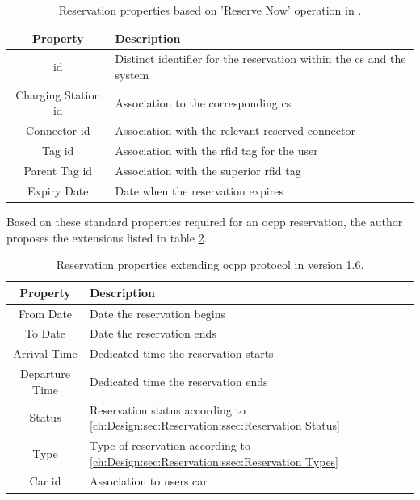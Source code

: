 \begingroup
\setlength{\tabcolsep}{10pt} %
\renewcommand{\arraystretch}{1.5} %
\begin{table}[h]
    \centering
    \caption{Reservation properties based on 'Reserve Now' operation in \cite{noauthor_ocpp_nodate}.}
    \begin{tabular}{c|m{10cm}}
        Property & Description \\ \hline
        \acrshort{id} & Distinct identifier for the reservation within the \acrshort{cs} and the system \\
        Charging Station \acrshort{id} & Association to the corresponding \acrshort{cs} \\
        Connector \acrshort{id} & Association with the relevant reserved connector \\
        Tag \acrshort{id} & Association with the \acrshort{rfid} tag for the user \\
        Parent Tag \acrshort{id} & Association with the superior \acrshort{rfid} tag \\
        Expiry Date & Date when the reservation expires
    \end{tabular}
    \label{tab:reservation-ocpp-properties}
\end{table}
\endgroup

\newpage

\noindent Based on these standard properties required for an \acrshort{ocpp} reservation, the author proposes the extensions listed in table \ref{tab:reservation-extended-properties}.

\begingroup
\setlength{\tabcolsep}{10pt} %
\renewcommand{\arraystretch}{1.5} %
\begin{table}[h]
    \centering
    \caption{Reservation properties extending \acrshort{ocpp} protocol in version 1.6.}
    \begin{tabular}{c|m{10cm}}
        Property & Description \\ \hline
        From Date & Date the reservation begins \\ 
        To Date & Date the reservation ends \\
        Arrival Time & Dedicated time the reservation starts \\
        Departure Time & Dedicated time the reservation ends \\
        Status & Reservation status according to \ref{ch:Design:sec:Reservation:ssec:Reservation Status} \\
        Type & Type of reservation according to \ref{ch:Design:sec:Reservation:ssec:Reservation Types} \\
        Car \acrshort{id} & Association to users car 
    \end{tabular}
    \label{tab:reservation-extended-properties}
\end{table}
\endgroup

